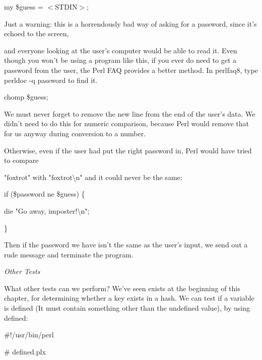 \documentclass[a4paper,11pt]{book}
\begin{document}
\noindent 

\noindent 

\noindent my \$guess = $<$STDIN$>$;

\noindent 

\noindent Just a warning: this is a horrendously bad way of asking for a password, since it's echoed to the screen,

\noindent and everyone looking at the user's computer would be able to read it. Even though you won't be using a program like this, if you ever do need to get a password from the user, the Perl FAQ provides a better method. In perlfaq8, type perldoc -q password to find it.

\noindent 

\noindent chomp \$guess;

\noindent 

\noindent We must never forget to remove the new line from the end of the user's data. We didn't need to do this for numeric comparison, because Perl would remove that for us anyway during conversion to a number.

\noindent Otherwise, even if the user had put the right password in, Perl would have tried to compare

\noindent "foxtrot" with "foxtrot\textbackslash n" and it could never be the same:

\noindent 

\noindent 

\noindent if (\$password ne \$guess) \{

\noindent die "Go away, imposter!\textbackslash n";

\noindent \}

\noindent 

\noindent Then if the password we have isn't the same as the user's input, we send out a rude message and terminate the program.

\noindent 

\noindent 

\noindent \textit{Other Tests}

\noindent What other tests can we perform? We've seen exists at the beginning of this chapter, for determining whether a key exists in a hash. We can test if a variable is defined (It must contain something other than the undefined value), by using defined:

\noindent 

\noindent \#!/usr/bin/perl

\noindent \# defined.plx
\end{document}
